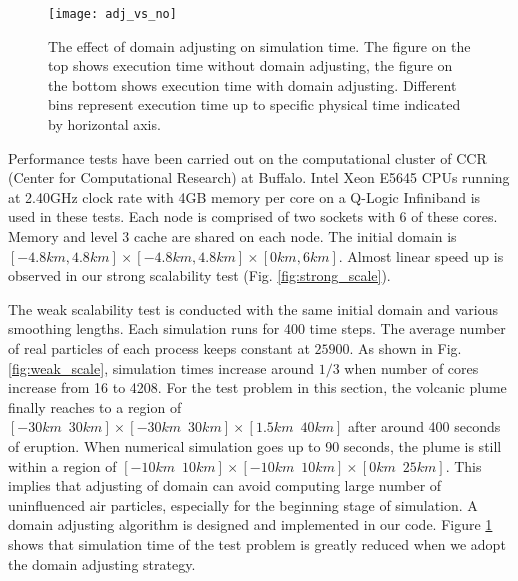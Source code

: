 \documentclass[gmd, manuscript]{copernicus} %
\providecommand{\DIFadd}[1]{{\protect\color{blue}\uwave{#1}}} %
\providecommand{\DIFdel}[1]{{\protect\color{red}\sout{#1}}}                      %
\providecommand{\DIFaddbegin}{} %
\providecommand{\DIFaddend}{} %
\providecommand{\DIFdelbegin}{} %
\providecommand{\DIFdelend}{} %
\begin{document}
\begin{figure}[!t]
\centering
\texttt{[image: adj\_vs\_no]}
\caption{The effect of domain adjusting on simulation time. The figure on the top shows execution time without domain adjusting, the figure on the bottom shows execution time with domain adjusting. Different bins represent execution time up to specific physical time indicated by horizontal axis.}
\label{fig:adj_vs_no}
\end{figure}

Performance tests have been carried out on the computational cluster of CCR (Center for Computational Research) at \DIFaddbegin \DIFadd{University at }\DIFaddend Buffalo. Intel Xeon E5645 CPUs running at 2.40GHz clock rate with 4GB memory per core on a Q-Logic Infiniband is used in these tests. Each node is comprised of two sockets with 6 of these cores. Memory and level 3 cache are shared on each node. The initial domain is \DIFdelbegin \DIFdel{$[-4.8km,4.8km] \times [-4.8km,4.8km] \times [0km, 6km]$}\DIFdelend \DIFaddbegin \DIFadd{$[-4.8km, 4.8km] \times [-4.8km,4.8km] \times [0km, 6km]$}\DIFaddend . Almost linear speed up is observed in our strong scalability test (Fig. \ref{fig:strong_scale}).

The weak scalability test is conducted with the same initial domain and various smoothing lengths. Each simulation runs for 400 time steps. The average number of real particles of each process keeps constant at $25900$. As shown in Fig. \ref{fig:weak_scale}, simulation times increase around $1/3$ when number of cores increase from 16 to 4208. For the test problem in this section, the volcanic plume finally reaches to a region of \DIFdelbegin \DIFdel{$[-30km \,\,\, 30km] \times [-30km\,\,\,30km] \times [1.5km\,\,\,40km]$ }\DIFdelend \DIFaddbegin \DIFadd{$[-30km , 30km] \times [-30km, 30km] \times [1.5km, 40km]$ }\DIFaddend after around 400 seconds of eruption. When numerical simulation goes up to 90 seconds, the plume is still within a region of \DIFdelbegin \DIFdel{$[-10km\,\,\,10km] \times [-10km\,\,\,10km] \times [0km\,\,\,25km]$}\DIFdelend \DIFaddbegin \DIFadd{$[-10km, 10km] \times [-10km, 10km] \times [0km,25km]$}\DIFaddend . This implies that adjusting of domain can avoid computing large number of uninfluenced air particles, especially for the beginning stage of simulation. A domain adjusting algorithm \DIFaddbegin \DIFadd{\mbox{%
\citep{cao2017data}
}%
}\DIFaddend is designed and implemented in our code. Figure \ref{fig:adj_vs_no} shows that simulation time of the test problem is greatly reduced when we adopt the domain adjusting strategy.
\end{document}
